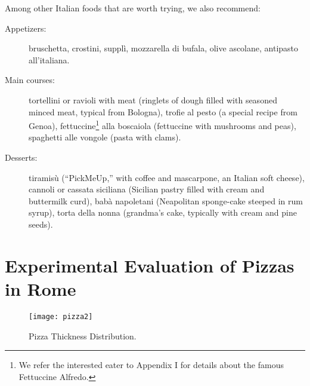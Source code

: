 \documentclass[twocolumn,10pt]{article}
\begin{document}
\noindent Among other Italian foods that are worth trying, we also 
recommend: 

\begin{description}

\item[Appetizers:] bruschetta, crostini, suppl\`i, mozzarella di 
bufala, olive ascolane, antipasto all'italiana.

\item[Main courses:] tortellini or ravioli with meat (ringlets of 
dough filled with seasoned minced meat, typical from Bologna), trofie 
al pesto (a special recipe from Genoa), fettuccine\footnote{We refer 
the interested eater to Appendix I for details about the famous 
Fettuccine Alfredo.} alla boscaiola (fettuccine with mushrooms and 
peas), spaghetti alle vongole (pasta with clams).

\item[Desserts:] tiramis\`u (``PickMeUp,'' with coffee and mascarpone, 
an Italian soft cheese), cannoli or cassata siciliana (Sicilian 
pastry filled with cream and buttermilk curd), bab\`a napoletani 
(Neapolitan sponge-cake steeped in rum syrup), torta della nonna 
(grandma's cake, typically with cream and pine seeds).

\end{description}

\section{Experimental Evaluation of Pizzas in Rome}

\begin{figure}[t!]
\begin{center}
\texttt{[image: pizza2]}
\end{center}
\caption{Pizza Thickness Distribution.}
\label{fi:pizza}
\end{figure}
\end{document}
